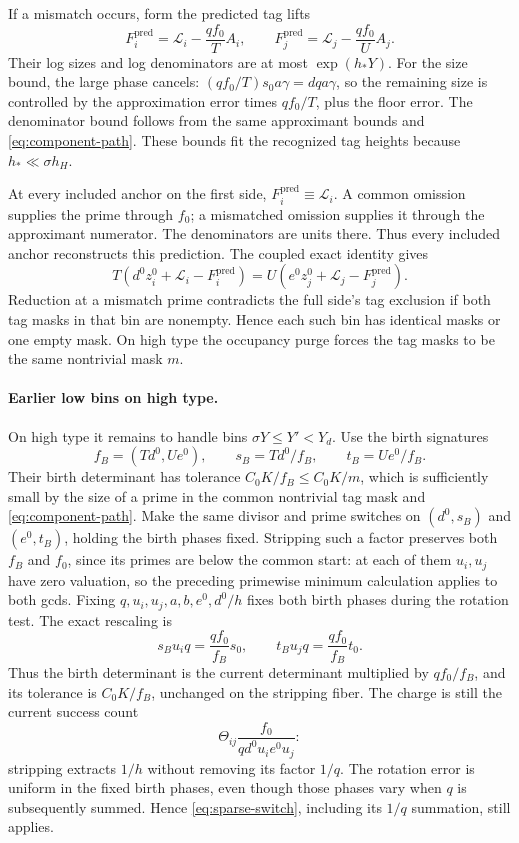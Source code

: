 If a mismatch occurs, form the predicted tag lifts
\begin{equation}\label{sp:predicted-tags}
 F_i^{\mathrm{pred}}=\mathcal L_i-\frac{qf_0}{T}A_i,
 \qquad
 F_j^{\mathrm{pred}}=\mathcal L_j-\frac{qf_0}{U}A_j.
\end{equation}
Their log sizes and log denominators are at most $\exp(h_*Y)$.
For the size bound, the large phase cancels:
$(qf_0/T)s_0a\gamma=dqa\gamma$, so the remaining size is controlled
by the approximation error times $qf_0/T$, plus the floor error.
The denominator bound follows from the same approximant bounds and
\eqref{eq:component-path}.  These bounds fit the recognized tag heights
because $h_*\ll\sigma h_H$.

At every included anchor on the first side,
$F_i^{\mathrm{pred}}\equiv\mathcal L_i$.  A common omission supplies
the prime through $f_0$; a mismatched omission supplies it through the
approximant numerator.  The denominators are units there.  Thus every
included anchor reconstructs this prediction.  The coupled exact
identity gives
\[
 T(d^0z_i^0+\mathcal L_i-F_i^{\mathrm{pred}})
 =U(e^0z_j^0+\mathcal L_j-F_j^{\mathrm{pred}}).
\]
Reduction at a mismatch prime contradicts the full side's tag exclusion
if both tag masks in that bin are nonempty.  Hence each such bin has
identical masks or one empty mask.  On high type the occupancy purge
forces the tag masks to be the same nontrivial mask $m$.

\paragraph{Earlier low bins on high type.}
On high type it remains to handle bins
$\sigma Y\le Y'<Y_d$.  Use the birth signatures
\[
 f_B=(Td^0,Ue^0),\qquad s_B=Td^0/f_B,
 \qquad t_B=Ue^0/f_B.
\]
Their birth determinant has tolerance
$C_0K/f_B\le C_0K/m$, which is sufficiently small by the size of a
prime in the common nontrivial tag mask and
\eqref{eq:component-path}.  Make the same divisor and prime switches
on $(d^0,s_B)$ and $(e^0,t_B)$, holding the birth phases fixed.
Stripping such a factor preserves both $f_B$ and $f_0$, since its primes
are below the common start: at each of them $u_i,u_j$ have zero
valuation, so the preceding primewise minimum calculation applies
to both gcds.  Fixing $q,u_i,u_j,a,b,e^0,d^0/h$ fixes both birth
phases during the rotation test.  The exact rescaling is
\[
 s_Bu_iq=\frac{qf_0}{f_B}s_0,
 \qquad t_Bu_jq=\frac{qf_0}{f_B}t_0.
\]
Thus the birth determinant is the current determinant multiplied by
$qf_0/f_B$, and its tolerance is $C_0K/f_B$, unchanged on the
stripping fiber.  The charge is still the current success count
\[
 \Theta_{ij}\frac{f_0}{q d^0u_i e^0u_j}:
\]
stripping extracts $1/h$ without removing its factor $1/q$.
The rotation error is uniform in the fixed birth phases, even though
those phases vary when $q$ is subsequently summed.  Hence
\eqref{eq:sparse-switch}, including its $1/q$ summation, still applies.

